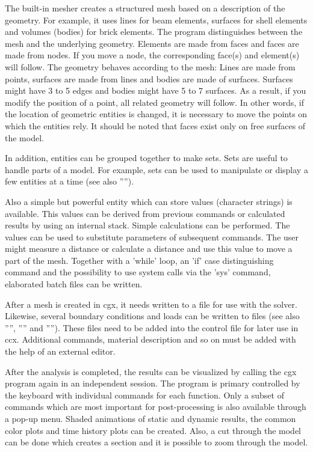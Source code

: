 \documentclass{article}
\begin{document}
The built-in mesher creates a structured mesh based on a description of the geometry. For example, it uses lines for beam elements, surfaces for shell elements and volumes (bodies) for brick elements. The program distinguishes between the mesh and the underlying geometry. Elements are made from faces and faces are made from nodes. If you move a node, the corresponding face(s) and element(s) will follow. The geometry behaves according to the mesh:
Lines are made from points, surfaces are made from lines and bodies are made of surfaces. Surfaces might have 3 to 5 edges and bodies might have 5 to 7 surfaces. As a result, if you modify the position of a point, all related geometry will follow. In other words, if the location of geometric entities is changed, it is necessary to move the points on which the entities rely.  It should be noted that faces exist only on free surfaces of the model.

In addition, entities can be grouped together to make sets. Sets are useful to handle parts of a model. For example, sets can be used to manipulate or display a few entities at a time (see also ''''). 

Also a simple but powerful entity which can store values (character strings) is available. This values can be derived from previous commands or calculated results by using an internal stack. Simple calculations can be performed. The values can be used to substitute parameters of subsequent commands. The user might measure a distance or calculate a distance and use this value to move a part of the mesh. Together with a 'while' loop, an 'if' case distinguishing command and the possibility to use system calls via the 'sys' command, elaborated batch files can be written.  

After a mesh is created in cgx, it needs written to a file for use with the solver. Likewise, several boundary conditions and loads can be written to files (see also '''', '''' and ''''). These files need to be added into the control file for later use in ccx. Additional commands, material description and so on must be added with the help of an external editor. 

After the analysis is completed, the results can be visualized by calling the cgx program again in an independent session. The program is primary controlled by the keyboard with individual commands for each function. Only a subset of commands which are most important for post-processing is also available through a pop-up menu. Shaded animations of static and dynamic results, the common color plots and time history plots can be created. Also, a cut through the model can be done which creates a section and it is possible to zoom through the model.
\end{document}
